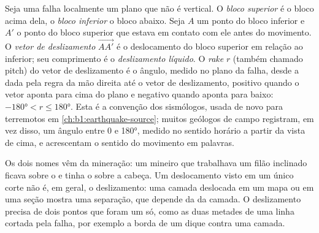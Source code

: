 \begin{definition}\label{def:b1:faults-folds-fabrics:fault-elements}
Seja uma falha localmente um plano que não é vertical. O \emph{bloco superior} é o bloco acima dela, o \emph{bloco inferior} o bloco abaixo. Seja $A$ um ponto do bloco inferior e $A'$ o ponto do bloco superior que estava em contato com ele antes do movimento. O \emph{vetor de deslizamento} $\overrightarrow{AA'}$ é o deslocamento do bloco superior em relação ao inferior; seu comprimento é o \emph{deslizamento líquido}. O \emph{rake} $r$ (também chamado pitch) do vetor de deslizamento é o ângulo, medido no plano da falha, desde a  dada pela regra da mão direita até o vetor de deslizamento, positivo quando o vetor aponta para cima do plano e negativo quando aponta para baixo: $\ang{-180} < r \le \ang{180}$. Esta é a convenção dos sismólogos, usada de novo para terremotos em \cref{ch:b1:earthquake-source}; muitos geólogos de campo registram, em vez disso, um ângulo entre 0 e \ang{180}, medido no sentido horário a partir da  vista de cima, e acrescentam o sentido do movimento em palavras.
\end{definition}

Os dois nomes vêm da mineração: um mineiro que trabalhava um filão inclinado ficava sobre o  e tinha o  sobre a cabeça. Um deslocamento visto em um único corte não é, em geral, o deslizamento: uma camada deslocada em um mapa ou em uma seção mostra uma separação, que depende da  da camada. O deslizamento precisa de dois pontos que foram um só, como as duas metades de uma linha cortada pela falha, por exemplo a borda de um dique contra uma camada.

